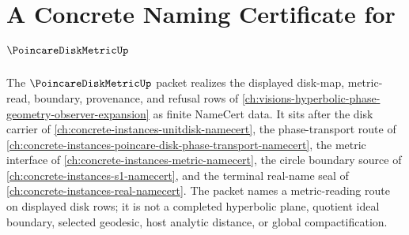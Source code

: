 \chapter{A Concrete Naming Certificate for $\PoincareDiskMetricUp$}
\label{ch:concrete-instances-poincare-disk-metric-namecert}

The $\PoincareDiskMetricUp$ packet realizes the displayed disk-map, metric-read, boundary, provenance, and refusal rows of \autoref{ch:visions-hyperbolic-phase-geometry-observer-expansion} as finite NameCert data. It sits after the disk carrier of \autoref{ch:concrete-instances-unitdisk-namecert}, the phase-transport route of \autoref{ch:concrete-instances-poincare-disk-phase-transport-namecert}, the metric interface of \autoref{ch:concrete-instances-metric-namecert}, the circle boundary source of \autoref{ch:concrete-instances-s1-namecert}, and the terminal real-name seal of \autoref{ch:concrete-instances-real-namecert}. The packet names a metric-reading route on displayed disk rows; it is not a completed hyperbolic plane, quotient ideal boundary, selected geodesic, host analytic distance, or global compactification.

